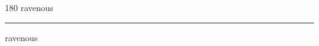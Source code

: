 
\begin{frame}
\begin{center}
\begin{turn}{180}
{\fontsize{2.5cm}{1em}\selectfont ravenous}
\end{turn}
\vspace{1em}\par  
\hrule
\vspace{1em}\par  
{\fontsize{2.5cm}{1em}\selectfont ravenous}
\end{center}
\end{frame}
